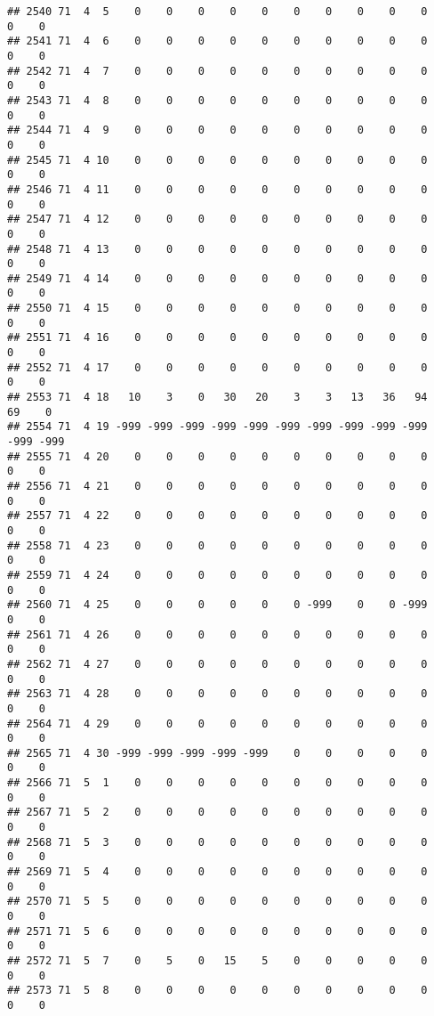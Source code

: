 \documentclass[]{article}
\begin{document}
\begin{verbatim}
## 2540 71  4  5    0    0    0    0    0    0    0    0    0    0    0    0
## 2541 71  4  6    0    0    0    0    0    0    0    0    0    0    0    0
## 2542 71  4  7    0    0    0    0    0    0    0    0    0    0    0    0
## 2543 71  4  8    0    0    0    0    0    0    0    0    0    0    0    0
## 2544 71  4  9    0    0    0    0    0    0    0    0    0    0    0    0
## 2545 71  4 10    0    0    0    0    0    0    0    0    0    0    0    0
## 2546 71  4 11    0    0    0    0    0    0    0    0    0    0    0    0
## 2547 71  4 12    0    0    0    0    0    0    0    0    0    0    0    0
## 2548 71  4 13    0    0    0    0    0    0    0    0    0    0    0    0
## 2549 71  4 14    0    0    0    0    0    0    0    0    0    0    0    0
## 2550 71  4 15    0    0    0    0    0    0    0    0    0    0    0    0
## 2551 71  4 16    0    0    0    0    0    0    0    0    0    0    0    0
## 2552 71  4 17    0    0    0    0    0    0    0    0    0    0    0    0
## 2553 71  4 18   10    3    0   30   20    3    3   13   36   94   69    0
## 2554 71  4 19 -999 -999 -999 -999 -999 -999 -999 -999 -999 -999 -999 -999
## 2555 71  4 20    0    0    0    0    0    0    0    0    0    0    0    0
## 2556 71  4 21    0    0    0    0    0    0    0    0    0    0    0    0
## 2557 71  4 22    0    0    0    0    0    0    0    0    0    0    0    0
## 2558 71  4 23    0    0    0    0    0    0    0    0    0    0    0    0
## 2559 71  4 24    0    0    0    0    0    0    0    0    0    0    0    0
## 2560 71  4 25    0    0    0    0    0    0 -999    0    0 -999    0    0
## 2561 71  4 26    0    0    0    0    0    0    0    0    0    0    0    0
## 2562 71  4 27    0    0    0    0    0    0    0    0    0    0    0    0
## 2563 71  4 28    0    0    0    0    0    0    0    0    0    0    0    0
## 2564 71  4 29    0    0    0    0    0    0    0    0    0    0    0    0
## 2565 71  4 30 -999 -999 -999 -999 -999    0    0    0    0    0    0    0
## 2566 71  5  1    0    0    0    0    0    0    0    0    0    0    0    0
## 2567 71  5  2    0    0    0    0    0    0    0    0    0    0    0    0
## 2568 71  5  3    0    0    0    0    0    0    0    0    0    0    0    0
## 2569 71  5  4    0    0    0    0    0    0    0    0    0    0    0    0
## 2570 71  5  5    0    0    0    0    0    0    0    0    0    0    0    0
## 2571 71  5  6    0    0    0    0    0    0    0    0    0    0    0    0
## 2572 71  5  7    0    5    0   15    5    0    0    0    0    0    0    0
## 2573 71  5  8    0    0    0    0    0    0    0    0    0    0    0    0

\end{verbatim}
\end{document}
